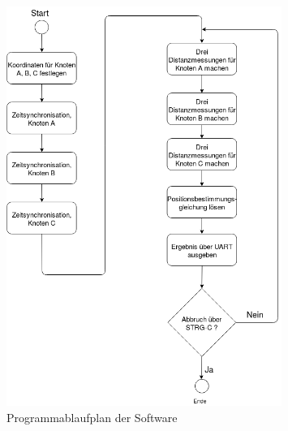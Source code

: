 \begin{figure}[H]
        \centering
        \includegraphics[width=0.8\textwidth]{images/PAP.png}
        \caption{Programmablaufplan der Software}
        \label{img:PAP}
\end{figure}